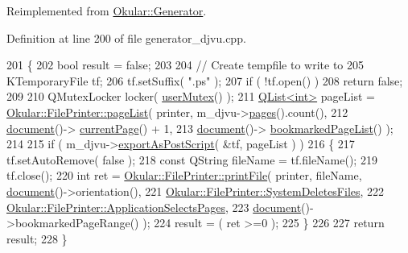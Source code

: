 Reimplemented from \hyperlink{classOkular_1_1Generator_aa786d406a1b0db6679a3bc62bbe2dc82}{Okular\+::\+Generator}.



Definition at line 200 of file generator\+\_\+djvu.\+cpp.


\begin{DoxyCode}
201 \{
202     \textcolor{keywordtype}{bool} result = \textcolor{keyword}{false};
203 
204     \textcolor{comment}{// Create tempfile to write to}
205     KTemporaryFile tf;
206     tf.setSuffix( \textcolor{stringliteral}{".ps"} );
207     \textcolor{keywordflow}{if} ( !tf.open() )
208         \textcolor{keywordflow}{return} \textcolor{keyword}{false};
209 
210     QMutexLocker locker( \hyperlink{classOkular_1_1Generator_a83d702cccbce2288c3258d97f1f15e19}{userMutex}() );
211     \hyperlink{classQList}{QList<int>} pageList = \hyperlink{classOkular_1_1FilePrinter_aed485e5e3fbe591b16e15915e318a1b7}{Okular::FilePrinter::pageList}( printer, 
      m\_djvu->\hyperlink{classKDjVu_aea351abdd42f5494382d2d3d20c1a94e}{pages}().count(),
212                                                          \hyperlink{classOkular_1_1Generator_a4248672ef04e62660d51f16c0a862bbe}{document}()->
      \hyperlink{classOkular_1_1Document_a42ec374d73794bf56d7e7b11f1f56319}{currentPage}() + 1,
213                                                          \hyperlink{classOkular_1_1Generator_a4248672ef04e62660d51f16c0a862bbe}{document}()->
      \hyperlink{classOkular_1_1Document_a01de5a7212e14772e647a8e1caa07627}{bookmarkedPageList}() );
214 
215     \textcolor{keywordflow}{if} ( m\_djvu->\hyperlink{classKDjVu_a476b8e76dc69d3872166fdf76ae2a8c2}{exportAsPostScript}( &tf, pageList ) )
216     \{
217         tf.setAutoRemove( \textcolor{keyword}{false} );
218         \textcolor{keyword}{const} QString fileName = tf.fileName();
219         tf.close();
220         \textcolor{keywordtype}{int} ret = \hyperlink{classOkular_1_1FilePrinter_abd5ec189d80d15983c49f91f7e1d38c1}{Okular::FilePrinter::printFile}( printer, fileName, 
      \hyperlink{classOkular_1_1Generator_a4248672ef04e62660d51f16c0a862bbe}{document}()->orientation(),
221                                                   
      \hyperlink{classOkular_1_1FilePrinter_acd01eb48e99f9289a7f4786a366ef7baa86d9b928c2434b89a15de26c8cc22705}{Okular::FilePrinter::SystemDeletesFiles},
222                                                   
      \hyperlink{classOkular_1_1FilePrinter_a755b647910344031db1d79312482981da3910c7efe4c8f4f8a69459765bea25a4}{Okular::FilePrinter::ApplicationSelectsPages},
223                                                   \hyperlink{classOkular_1_1Generator_a4248672ef04e62660d51f16c0a862bbe}{document}()->bookmarkedPageRange() );
224         result = ( ret >=0 );
225     \}
226 
227     \textcolor{keywordflow}{return} result;
228 \}
\end{DoxyCode}
